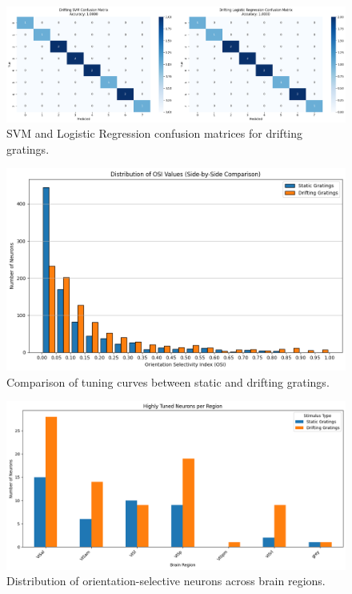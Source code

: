 \documentclass[10pt,twocolumn]{article}
\begin{document}
\begin{figure}[ht]
\centering
\includegraphics[width=\linewidth]{report_images/drifting_SVM_LogR_confusion_matrix.png}
\caption{SVM and Logistic Regression confusion matrices for drifting gratings.}
\label{fig:drifting_svm_logr_cm}
\end{figure}

\begin{figure}[ht]
\centering
\includegraphics[width=\linewidth]{report_images/tuning_curves_comparison.png}
\caption{Comparison of tuning curves between static and drifting gratings.}
\label{fig:tuning_comparison}
\end{figure}

\begin{figure}[ht]
\centering
\includegraphics[width=\linewidth]{report_images/tuned_neurons_region.png}
\caption{Distribution of orientation-selective neurons across brain regions.}
\label{fig:tuned_regions}
\end{figure}
\end{document}
